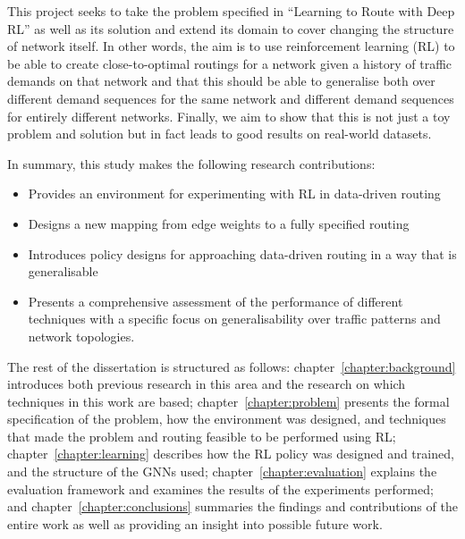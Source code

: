 This project seeks to take the problem specified in ``Learning to Route with Deep RL'' as well as its solution and extend its domain to cover changing the structure of network itself. In other words, the aim is to use reinforcement learning (RL) to be able to create close-to-optimal routings for a network given a history of traffic demands on that network and that this should be able to generalise both over different demand sequences for the same network and different demand sequences for entirely different networks. Finally, we aim to show that this is not just a toy problem and solution but in fact leads to good results on real-world datasets.

In summary, this study makes the following research contributions:
\begin{itemize}
  \item Provides an environment for experimenting with RL in data-driven routing
  \item Designs a new mapping from edge weights to a fully specified routing
  \item Introduces policy designs for approaching data-driven routing in a way that is generalisable
  \item Presents a comprehensive assessment of the performance of different techniques with a specific focus on generalisability over traffic patterns and network topologies.
\end{itemize}

The rest of the dissertation is structured as follows: chapter~\ref{chapter:background} introduces both previous research in this area and the research on which techniques in this work are based; chapter~\ref{chapter:problem} presents the formal specification of the problem, how the environment was designed, and techniques that made the problem and routing feasible to be performed using RL; chapter~\ref{chapter:learning} describes how the RL policy was designed and trained, and the structure of the GNNs used; chapter~\ref{chapter:evaluation} explains the evaluation framework and examines the results of the experiments performed; and chapter~\ref{chapter:conclusions} summaries the findings and contributions of the entire work as well as providing an insight into possible future work.

